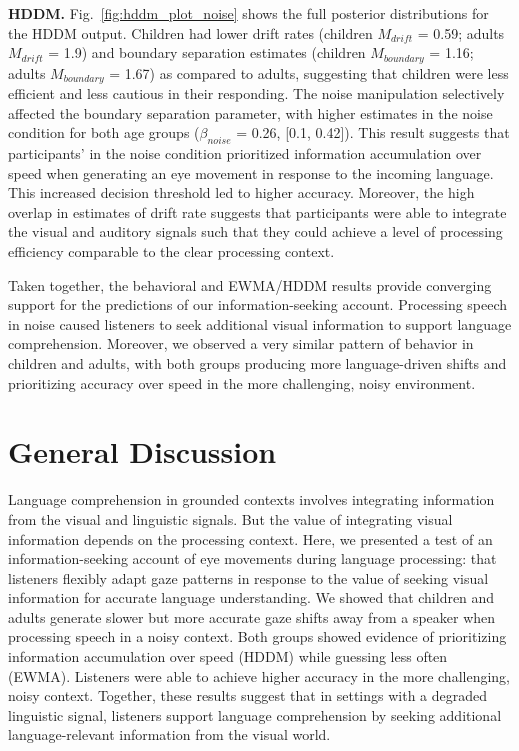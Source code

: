\documentclass[10pt, letterpaper]{article}
\begin{document}
\textbf{HDDM.} Fig.~\ref{fig:hddm_plot_noise} shows the full posterior
distributions for the HDDM output. Children had lower drift rates
(children \(M_{drift}\) = 0.59; adults \(M_{drift}\) = 1.9) and boundary
separation estimates (children \(M_{boundary}\) = 1.16; adults
\(M_{boundary}\) = 1.67) as compared to adults, suggesting that children
were less efficient and less cautious in their responding. The noise
manipulation selectively affected the boundary separation parameter,
with higher estimates in the noise condition for both age groups
(\(\beta_{noise}\) = 0.26, {[}0.1, 0.42{]}). This result suggests that
participants' in the noise condition prioritized information
accumulation over speed when generating an eye movement in response to
the incoming language. This increased decision threshold led to higher
accuracy. Moreover, the high overlap in estimates of drift rate suggests
that participants were able to integrate the visual and auditory signals
such that they could achieve a level of processing efficiency comparable
to the clear processing context.

Taken together, the behavioral and EWMA/HDDM results provide converging
support for the predictions of our information-seeking account.
Processing speech in noise caused listeners to seek additional visual
information to support language comprehension. Moreover, we observed a
very similar pattern of behavior in children and adults, with both
groups producing more language-driven shifts and prioritizing accuracy
over speed in the more challenging, noisy environment.

\hypertarget{general-discussion}{%
\section{General Discussion}\label{general-discussion}}

Language comprehension in grounded contexts involves integrating
information from the visual and linguistic signals. But the value of
integrating visual information depends on the processing context. Here,
we presented a test of an information-seeking account of eye movements
during language processing: that listeners flexibly adapt gaze patterns
in response to the value of seeking visual information for accurate
language understanding. We showed that children and adults generate
slower but more accurate gaze shifts away from a speaker when processing
speech in a noisy context. Both groups showed evidence of prioritizing
information accumulation over speed (HDDM) while guessing less often
(EWMA). Listeners were able to achieve higher accuracy in the more
challenging, noisy context. Together, these results suggest that in
settings with a degraded linguistic signal, listeners support language
comprehension by seeking additional language-relevant information from
the visual world.
\end{document}
